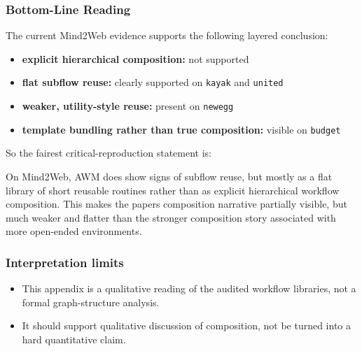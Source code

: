 \subsubsection{Bottom-Line Reading}

The current Mind2Web evidence supports the following layered conclusion:

\begin{itemize}
\tightlist
\item
  \textbf{explicit hierarchical composition:} not supported
\item
  \textbf{flat subflow reuse:} clearly supported on \texttt{kayak} and
  \texttt{united}
\item
  \textbf{weaker, utility-style reuse:} present on \texttt{newegg}
\item
  \textbf{template bundling rather than true composition:} visible on
  \texttt{budget}
\end{itemize}

So the fairest critical-reproduction statement is:

On Mind2Web, AWM does show signs of subflow reuse, but mostly as a flat
library of short reusable routines rather than as explicit hierarchical
workflow composition. This makes the paper\textquotesingle s composition
narrative partially visible, but much weaker and flatter than the
stronger composition story associated with more open-ended environments.

\subsubsection{Interpretation limits}

\begin{itemize}
\tightlist
\item
  This appendix is a qualitative reading of the audited workflow
  libraries, not a formal graph-structure analysis.
\item
  It should support qualitative discussion of composition, not be turned
  into a hard quantitative claim.
\end{itemize}
